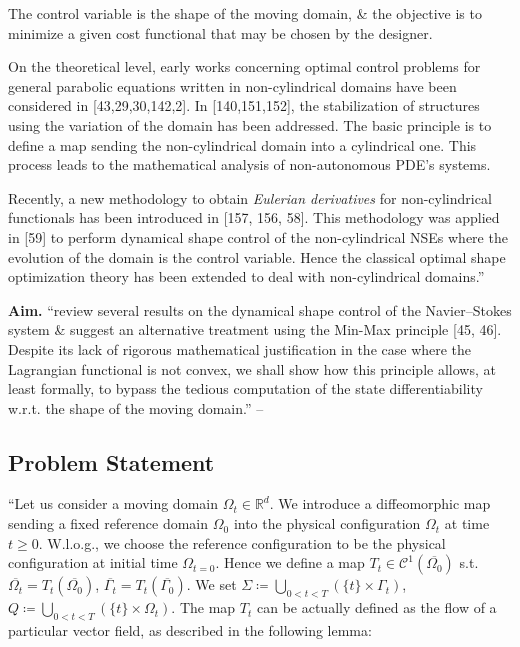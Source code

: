 \documentclass[oneside]{book}
\numberwithin{equation}{section}
\begin{document}
The control variable is the shape of the moving domain, \& the objective is to minimize a given cost functional that may be chosen by the designer.

On the theoretical level, early works concerning optimal control problems for general parabolic equations written in non-cylindrical domains have been considered in [43,29,30,142,2]. In [140,151,152], the stabilization of structures using the variation of the domain has been addressed. The basic principle is to define a map sending the non-cylindrical domain into a cylindrical one. This process leads to the mathematical analysis of non-autonomous PDE's systems.

Recently, a new methodology to obtain \textit{Eulerian derivatives} for non-cylindrical functionals has been introduced in [157, 156, 58]. This methodology was applied in [59] to perform dynamical shape control of the non-cylindrical NSEs where the evolution of the domain is the control variable. Hence the classical optimal shape optimization theory has been extended to deal with non-cylindrical domains.''

\textbf{Aim.} ``review several results on the dynamical shape control of the Navier--Stokes system \& suggest an alternative treatment using the Min-Max principle [45, 46]. Despite its lack of rigorous mathematical justification in the case where the Lagrangian functional is not convex, we shall show how this principle allows, at least formally, to bypass the tedious computation of the state differentiability w.r.t. the shape of the moving domain.'' -- \cite[Chap. 5, p. 109]{Moubachir_Zolesio2006}

\subsection{Problem Statement}
``Let us consider a moving domain $\Omega_t\in\mathbb{R}^d$. We introduce a diffeomorphic map sending a fixed reference domain $\Omega_0$ into the physical configuration $\Omega_t$ at time $t\ge 0$. W.l.o.g., we choose the reference configuration to be the physical configuration at initial time $\Omega_{t=0}$. Hence we define a map $T_t\in\mathcal{C}^1(\overline{\Omega_0})$ s.t. $\overline{\Omega_t} = T_t(\overline{\Omega_0})$, $\overline{\Gamma_t} = T_t(\overline{\Gamma_0})$. We set $\Sigma\coloneqq\bigcup_{0 < t < T} (\{t\}\times\Gamma_t)$, $Q\coloneqq\bigcup_{0 < t < T} (\{t\}\times\Omega_t)$. The map $T_t$ can be actually defined as the flow of a particular vector field, as described in the following lemma:
\end{document}
